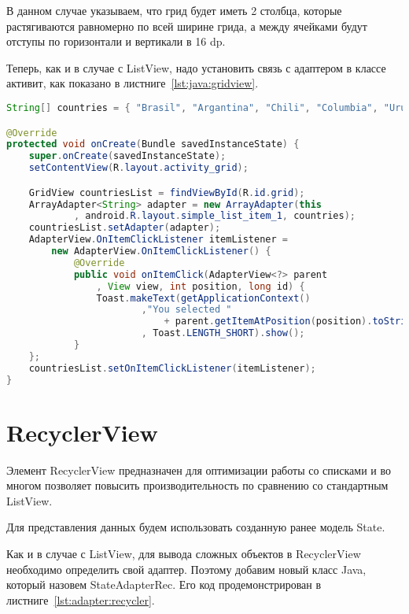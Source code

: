 В данном случае указываем, что грид будет иметь 2 столбца, которые
растягиваются равномерно по всей ширине грида, а между ячейками будут
отступы по горизонтали и вертикали в 16 dp.\par
Теперь, как и в случае с ListView, надо установить связь с адаптером в
классе активит, как показано в листниге~\ref{lst:java:gridview}.

\begin{lstlisting}[language=Java
	, label=lst:java:gridview
	]
String[] countries = { "Brasil", "Argantina", "Chili", "Columbia", "Urugvai"};

@Override
protected void onCreate(Bundle savedInstanceState) {
	super.onCreate(savedInstanceState);
	setContentView(R.layout.activity_grid);

	GridView countriesList = findViewById(R.id.grid);
	ArrayAdapter<String> adapter = new ArrayAdapter(this
			, android.R.layout.simple_list_item_1, countries);
	countriesList.setAdapter(adapter);
	AdapterView.OnItemClickListener itemListener =
		new AdapterView.OnItemClickListener() {
			@Override
			public void onItemClick(AdapterView<?> parent
				, View view, int position, long id) {
				Toast.makeText(getApplicationContext()
						,"You selected "
							+ parent.getItemAtPosition(position).toString()
						, Toast.LENGTH_SHORT).show();
			}
	};
	countriesList.setOnItemClickListener(itemListener);
}
\end{lstlisting}

\section{RecyclerView}
Элемент RecyclerView предназначен для оптимизации работы со списками и
во многом позволяет повысить производительность по сравнению со
стандартным ListView.\par
Для представления данных будем использовать созданную ранее модель State.\par
Как и в случае с ListView, для вывода сложных объектов в RecyclerView
необходимо определить свой адаптер. Поэтому добавим новый класс Java,
который назовем StateAdapterRec.
Его код продемонстрирован в листниге~\ref{lst:adapter:recycler}.

